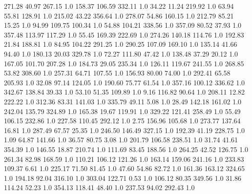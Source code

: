     271.28     40.97    267.15  1.0
    158.37    106.59    332.11  1.0
     34.22     11.24    219.92  1.0
     63.94     55.81    128.91  1.0
    215.02     43.22    356.64  1.0
    278.07     54.86    160.15  1.0
    212.79     85.21     15.25  1.0
     94.99    109.75    100.34  1.0
     54.88    104.21    338.56  1.0
    357.09     80.52     37.93  1.0
    357.48    113.97    117.29  1.0
     55.45    169.39    222.69  1.0
    274.26    140.18    114.76  1.0
    192.83     21.84    188.81  1.0
     84.95    104.22    291.25  1.0
    290.25    107.09    169.10  1.0
    135.14     41.66     94.40  1.0
    180.13     20.03    329.78  1.0
     72.27    111.80     47.42  1.0
    138.48     37.29     20.12  1.0
    167.05    101.70    207.28  1.0
    184.73     29.05    235.34  1.0
    126.11    119.67    241.55  1.0
    268.85     53.82    308.60  1.0
    257.31     64.71    107.55  1.0
    156.93     80.00     74.00  1.0
    292.41     65.58    205.93  1.0
     32.08     97.14    124.05  1.0
    190.60     75.77     61.54  1.0
    357.16    100.12    336.62  1.0
    342.67    138.84     39.33  1.0
     53.10     51.35    109.89  1.0
      9.16    116.82     90.64  1.0
    208.11     12.82    222.22  1.0
    312.36     83.31    141.03  1.0
    335.79     49.11      5.08  1.0
     28.49    142.18    161.02  1.0
    242.04    135.79    324.89  1.0
    165.38     19.67    119.91  1.0
    329.22    121.41    258.49  1.0
     55.49    106.15    232.86  1.0
    227.58    110.45    292.12  1.0
      2.75    156.96    105.68  1.0
    273.77    137.64     16.81  1.0
    287.49     67.57     25.35  1.0
    246.50    146.49    327.15  1.0
    192.39     41.19    228.75  1.0
      1.09     64.87    141.66  1.0
     36.57     80.75      3.08  1.0
    201.79    106.58    238.51  1.0
     31.74     41.61    354.39  1.0
    146.55     18.87    210.74  1.0
    111.69     83.45    188.56  1.0
    264.25     42.52    126.75  1.0
    261.34     82.98    168.59  1.0
    110.21    106.12    121.26  1.0
    163.14    159.06    241.16  1.0
    233.83    109.37      6.61  1.0
    225.17     71.50     81.45  1.0
     47.60     54.86     82.72  1.0
    161.36    163.12    324.65  1.0
    194.18     92.04    316.10  1.0
    303.04    122.71      0.53  1.0
    106.12     80.35    349.56  1.0
     31.86    114.24     52.23  1.0
    354.13    118.41     48.40  1.0
    237.53     94.02    292.43  1.0